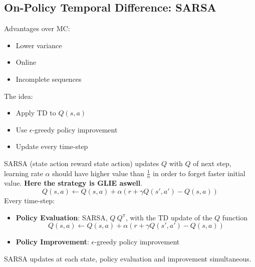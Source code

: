 \subsection{On-Policy Temporal Difference: SARSA}
    Advantages over MC:
    \begin{itemize}
        \item Lower variance
        \item Online
        \item Incomplete sequences
    \end{itemize}
    The idea:
    \begin{itemize}
        \item Apply TD to $Q(s,a)$
        \item Use $\epsilon$-greedy policy improvement
        \item Update every time-step
    \end{itemize}
    SARSA (state action reward state action) updates $Q$ with $Q$ of next step, learning rate $\alpha$ should have higher value than $\frac{1}{n}$ in order to forget faster initial value. \textbf{Here the strategy is GLIE aswell}.
    $$Q(s,a)\leftarrow Q(s,a)+\alpha(r+\gamma Q(s',a')-Q(s,a))$$
    Every time-step:
    \begin{itemize}
        \item \textbf{Policy Evaluation}: SARSA, $Q~Q^\pi$, with the TD update of the $Q$ function
        $$Q(s,a)\leftarrow Q(s,a)+\alpha(r+\gamma Q(s',a')-Q(s,a))$$
        \item \textbf{Policy Improvement}: $\epsilon$-greedy policy improvement
    \end{itemize}
    SARSA updates at each state, policy evaluation and improvement simultaneous.\\
    \\
